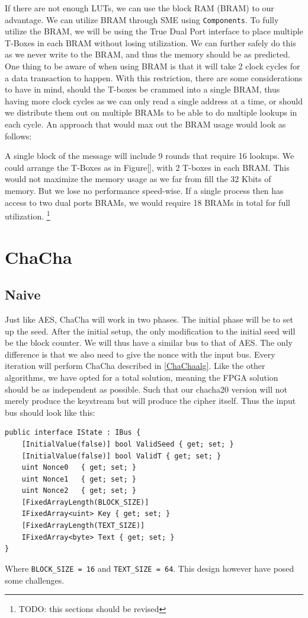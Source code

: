 \documentclass[a4paper, openany]{book}
\begin{document}
\begin{abstact}
If there are not enough LUTs, we can use the block RAM (BRAM) to our advantage. We can utilize BRAM through SME using \texttt{Components}. To fully utilize the BRAM, we will be using the True Dual Port interface to place multiple T-Boxes in each BRAM without losing utilization. We can further safely do this as we never write to the BRAM, and thus the memory should be as predicted. One thing to be aware of when using BRAM is that it will take 2 clock cycles for a data transaction to happen. With this restriction, there are some considerations to have in mind, should the T-boxes be crammed into a single BRAM, thus having more clock cycles as we can only read a single address at a time, or should we distribute them out on multiple BRAMs to be able to do multiple lookups in each cycle. An approach that would max out the BRAM usage would look as follows:

A single block of the message will include 9 rounds that require 16 lookups. We could arrange the T-Boxes as in Figure\ref{}, with 2 T-boxes in each BRAM. This would not maximize the memory usage as we far from fill the 32 Kbits of memory. But we lose no performance speed-wise. If a single process then has access to two dual ports BRAMs, we would require 18 BRAMs in total for full utilization. \footnote{TODO: this sections should be revised}
\section{ChaCha}
\label{sec:org10e4739}

\subsection{Naive}
\label{ChaChaNaive}
Just like AES, ChaCha will work in two phases. The initial phase will be to set up the seed. After the initial setup, the only modification to the initial seed will be the block counter. We will thus have a similar bus to that of AES. The only difference is that we also need to give the nonce with the input bus. Every iteration will perform ChaCha described in \ref{ChaChaalg}. Like the other algorithms, we have opted for a total solution, meaning the FPGA solution should be as independent as possible. Such that our chacha20 version will not merely produce the keystream but will produce the cipher itself. Thus the input bus should look like this:
\begin{verbatim}
public interface IState : IBus {
    [InitialValue(false)] bool ValidSeed { get; set; }
    [InitialValue(false)] bool ValidT { get; set; }
    uint Nonce0   { get; set; }
    uint Nonce1   { get; set; }
    uint Nonce2   { get; set; }
    [FixedArrayLength(BLOCK_SIZE)]
    IFixedArray<uint> Key { get; set; }
    [FixedArrayLength(TEXT_SIZE)]
    IFixedArray<byte> Text { get; set; }
}
\end{verbatim}
Where \texttt{BLOCK\_SIZE = 16} and \texttt{TEXT\_SIZE = 64}. This design however have posed some challenges.

\end{abstact}
\end{document}
